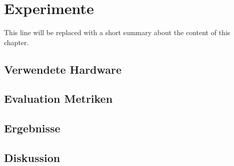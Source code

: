 \chapter{Experimente} \label{chap:experimentresult}

This line will be replaced with a short summary about the content of this chapter.

\section{Verwendete Hardware}

\section{Evaluation Metriken}

\section{Ergebnisse}

\section{Diskussion}
